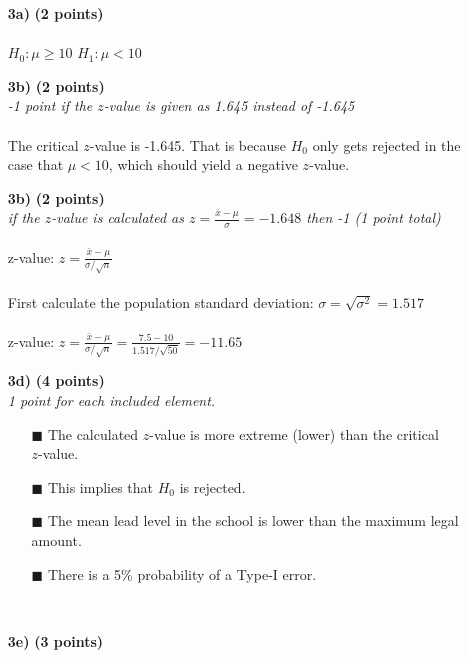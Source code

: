 \begin{itemize}
\item[\textbf{3a)}] \textbf{(2 points)} \\ \\
$H_0: \mu \geq 10$ \hspace{3cm} $H_1: \mu < 10$ \\
\item[\textbf{3b)}] \textbf{(2 points)} \\
\textit{-1 point if the $z$-value is given as 1.645 instead of -1.645} \\ \\
The critical $z$-value is -1.645. That is because $H_0$ only gets rejected in the case that $\mu < 10$, which should yield a negative $z$-value. \\
\item[\textbf{3b)}] \textbf{(2 points)} \\
\textit{if the $z$-value is calculated as $z = \frac{\bar{x} - \mu}{\sigma} = -1.648$ then -1 (1 point total)} \\ \\
z-value: $z = \frac{\bar{x} - \mu}{\sigma / \sqrt{n}}$ \\ \\
First calculate the population standard deviation: $\sigma = \sqrt{\sigma^2} = 1.517$ \\ \\
z-value: $z = \frac{\bar{x} - \mu}{\sigma / \sqrt{n}} = \frac{7.5 - 10}{1.517 / \sqrt{50}} = -11.65$ \\
\item[\textbf{3d)}] \textbf{(4 points)} \\
\textit{1 point for each included element.}
        \begin{itemize}
        \item[$\blacksquare$] The calculated $z$-value is more extreme (lower) than the critical \\$z$-value.
        \item[$\blacksquare$] This implies that $H_0$ is rejected.
        \item[$\blacksquare$] The mean lead level in the school is lower than the maximum legal amount.
        \item[$\blacksquare$] There is a 5\% probability of a Type-I error.
        \end{itemize} \\
\item[\textbf{3e)}] \textbf{(3 points)} \\

\end{itemize}
